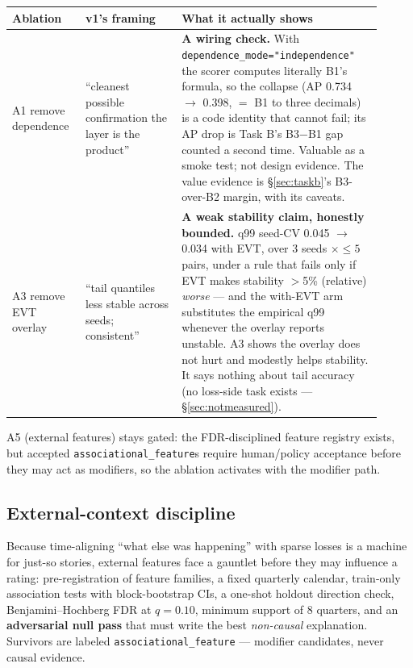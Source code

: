 \documentclass[11pt]{article}
\begin{document}
\begin{table}[h!]
\centering\small
\begin{tabular}{@{}p{0.17\linewidth}p{0.24\linewidth}p{0.50\linewidth}@{}}
\toprule
Ablation & v1's framing & What it actually shows \\
\midrule
A1 remove dependence & ``cleanest possible confirmation the layer is the
product'' & \textbf{A wiring check.} With
\texttt{dependence\_mode="independence"} the scorer computes literally B1's
formula, so the collapse (AP 0.734 $\to$ 0.398, $=$ B1 to three decimals) is
a code identity that cannot fail; its AP drop is Task B's B3$-$B1 gap
counted a second time. Valuable as a smoke test; not design evidence. The
value evidence is \S\ref{sec:taskb}'s B3-over-B2 margin, with its caveats. \\
\addlinespace
A3 remove EVT overlay & ``tail quantiles less stable across seeds;
consistent'' & \textbf{A weak stability claim, honestly bounded.} q99
seed-CV 0.045 $\to$ 0.034 with EVT, over 3 seeds $\times \le 5$ pairs, under
a rule that fails only if EVT makes stability $>$5\% (relative)
\emph{worse} --- and the with-EVT arm substitutes the empirical q99 whenever
the overlay reports unstable. A3 shows the overlay does not hurt and
modestly helps stability. It says nothing about tail accuracy (no loss-side
task exists --- \S\ref{sec:notmeasured}). \\
\bottomrule
\end{tabular}
\end{table}

A5 (external features) stays gated: the FDR-disciplined feature registry
exists, but accepted \texttt{associational\_feature}s require human/policy
acceptance before they may act as modifiers, so the ablation activates with
the modifier path.

\subsection{External-context discipline}
\label{sec:ext}

Because time-aligning ``what else was happening'' with sparse losses is a
machine for just-so stories, external features face a gauntlet before they
may influence a rating: pre-registration of feature families, a fixed
quarterly calendar, train-only association tests with block-bootstrap CIs, a
one-shot holdout direction check, Benjamini--Hochberg FDR at $q = 0.10$,
minimum support of 8 quarters, and an \textbf{adversarial null pass} that
must write the best \emph{non-causal} explanation. Survivors are labeled
\texttt{associational\_feature} --- modifier candidates, never causal
evidence.
\end{document}
